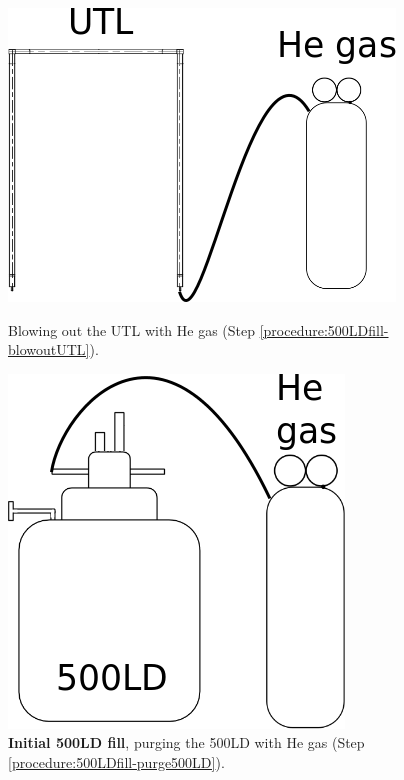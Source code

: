 \begin{figure}[htbp!]
 \centering
 \begin{minipage}{.47\textwidth}
 \includegraphics[width=\textwidth]{./img/500LDfill-01-blow-out-UTL.png}
 \caption{Blowing out the UTL with He gas (Step \ref{procedure:500LDfill-blowoutUTL}).}
 \label{fig:500LDfill-01-blow-out-UTL}
 \end{minipage}
 \quad
 \begin{minipage}{.47\textwidth}
 \includegraphics[width=\textwidth]{./img/500LDfill-02-blow-out-500LD.png}
 \caption{\textbf{Initial 500LD fill}, purging the 500LD with He gas (Step \ref{procedure:500LDfill-purge500LD}).}
 \label{fig:500LDfill-02-blow-out-500LD}
 \end{minipage}
\end{figure}

